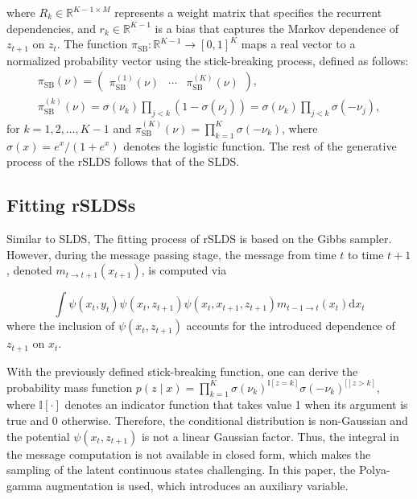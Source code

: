where $R_{k} \in \mathbb{R}^{K-1 \times M}$ represents a weight matrix that specifies the recurrent dependencies, and $r_{k} \in \mathbb{R}^{K-1}$ is a bias that captures the Markov dependence of $z_{t+1}$ on $z_{t}$. The function $\pi_{\mathrm{SB}}: \mathbb{R}^{K-1} \rightarrow[0,1]^{K}$ maps a real vector to a normalized probability vector using the stick-breaking process, defined as follows:
$$
\begin{gathered}
\pi_{\mathrm{SB}}(\nu)=\left(\begin{array}{lll}
\pi_{\mathrm{SB}}^{(1)}(\nu) & \cdots & \pi_{\mathrm{SB}}^{(K)}(\nu)
\end{array}\right), \\
\pi_{\mathrm{SB}}^{(k)}(\nu)=\sigma\left(\nu_{k}\right) \prod_{j<k}\left(1-\sigma\left(\nu_{j}\right)\right)=\sigma\left(\nu_{k}\right) \prod_{j<k} \sigma\left(-\nu_{j}\right),
\end{gathered}
$$
for $k=1,2, \ldots, K-1$ and $\pi_{\mathrm{SB}}^{(K)}(\nu)=\prod_{k=1}^{K} \sigma\left(-\nu_{k}\right)$, where $\sigma(x)=e^{x} /\left(1+e^{x}\right)$ denotes the logistic function. The rest of the generative process of the rSLDS follows that of the SLDS. 

\subsection{Fitting rSLDSs} 
Similar to SLDS, The fitting process of rSLDS is based on the Gibbs sampler. However, during the message passing stage, the message from time $t$ to time $t+1$, denoted $m_{t \rightarrow t+1}\left(x_{t+1}\right)$, is computed via

$$
\int \psi\left(x_{t}, y_{t}\right) \psi\left(x_{t}, z_{t+1}\right) \psi\left(x_{t}, x_{t+1}, z_{t+1}\right) m_{t-1 \rightarrow t}\left(x_{t}\right) \mathrm{d} x_{t}
$$ 
where the inclusion of $\psi\left(x_{t}, z_{t+1}\right)$ accounts for the introduced dependence of $z_{t+1}$ on $x_t$.

With the previously defined stick-breaking function, one can derive the probability mass function $p(z \mid x)=\prod_{k=1}^{K} \sigma\left(\nu_{k}\right)^{\mathbb{I}[z=k]} \sigma\left(-\nu_{k}\right)^{\mathbb{[}[z>k]}
$, where $\mathbb{I}[\cdot]$ denotes an indicator function that takes value 1 when its argument is true and 0 otherwise. Therefore, the conditional distribution is non-Gaussian and the potential $\psi\left(x_{t}, z_{t+1}\right)$ is not a linear Gaussian factor. Thus, the integral in the message computation is not available in closed form, which makes the sampling of the latent continuous states challenging. In this paper, the Polya-gamma augmentation \cite{linderman_dependent_2015} is used, which introduces an auxiliary variable.

